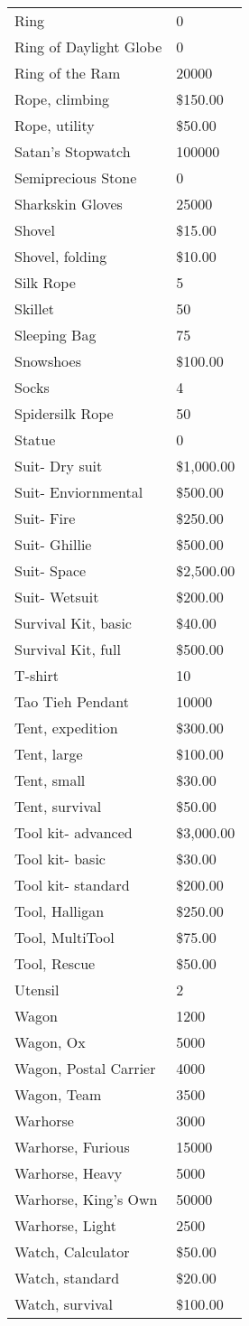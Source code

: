 \documentclass[twoside]{book}
\begin{document}
\begin{longtable}{p{1.25in}l}
      \raggedright Ring&0\tabularnewline
      \raggedright Ring of Daylight Globe&0\tabularnewline
      \raggedright Ring of the Ram&20000\tabularnewline
      \raggedright Rope, climbing&\$150.00\tabularnewline
      \raggedright Rope, utility&\$50.00\tabularnewline
      \raggedright Satan's Stopwatch&100000\tabularnewline
      \raggedright Semiprecious Stone&0\tabularnewline
      \raggedright Sharkskin Gloves&25000\tabularnewline
      \raggedright Shovel&\$15.00\tabularnewline
      \raggedright Shovel, folding&\$10.00\tabularnewline
      \raggedright Silk Rope&5\tabularnewline
      \raggedright Skillet&50\tabularnewline
      \raggedright Sleeping Bag&75\tabularnewline
      \raggedright Snowshoes&\$100.00\tabularnewline
      \raggedright Socks&4\tabularnewline
      \raggedright Spidersilk Rope&50\tabularnewline
      \raggedright Statue&0\tabularnewline
      \raggedright Suit- Dry suit&\$1,000.00\tabularnewline
      \raggedright Suit- Enviornmental&\$500.00\tabularnewline
      \raggedright Suit- Fire&\$250.00\tabularnewline
      \raggedright Suit- Ghillie&\$500.00\tabularnewline
      \raggedright Suit- Space&\$2,500.00\tabularnewline
      \raggedright Suit- Wetsuit&\$200.00\tabularnewline
      \raggedright Survival Kit, basic&\$40.00\tabularnewline
      \raggedright Survival Kit, full&\$500.00\tabularnewline
      \raggedright T-shirt&10\tabularnewline
      \raggedright Tao Tieh Pendant&10000\tabularnewline
      \raggedright Tent, expedition&\$300.00\tabularnewline
      \raggedright Tent, large&\$100.00\tabularnewline
      \raggedright Tent, small&\$30.00\tabularnewline
      \raggedright Tent, survival&\$50.00\tabularnewline
      \raggedright Tool kit- advanced&\$3,000.00\tabularnewline
      \raggedright Tool kit- basic&\$30.00\tabularnewline
      \raggedright Tool kit- standard&\$200.00\tabularnewline
      \raggedright Tool, Halligan&\$250.00\tabularnewline
      \raggedright Tool, MultiTool&\$75.00\tabularnewline
      \raggedright Tool, Rescue&\$50.00\tabularnewline
      \raggedright Utensil&2\tabularnewline
      \raggedright Wagon&1200\tabularnewline
      \raggedright Wagon, Ox&5000\tabularnewline
      \raggedright Wagon, Postal Carrier&4000\tabularnewline
      \raggedright Wagon, Team&3500\tabularnewline
      \raggedright Warhorse&3000\tabularnewline
      \raggedright Warhorse, Furious&15000\tabularnewline
      \raggedright Warhorse, Heavy&5000\tabularnewline
      \raggedright Warhorse, King's Own&50000\tabularnewline
      \raggedright Warhorse, Light&2500\tabularnewline
      \raggedright Watch, Calculator&\$50.00\tabularnewline
      \raggedright Watch, standard&\$20.00\tabularnewline
      \raggedright Watch, survival&\$100.00\tabularnewline
      
\end{longtable}
    
\end{document}

